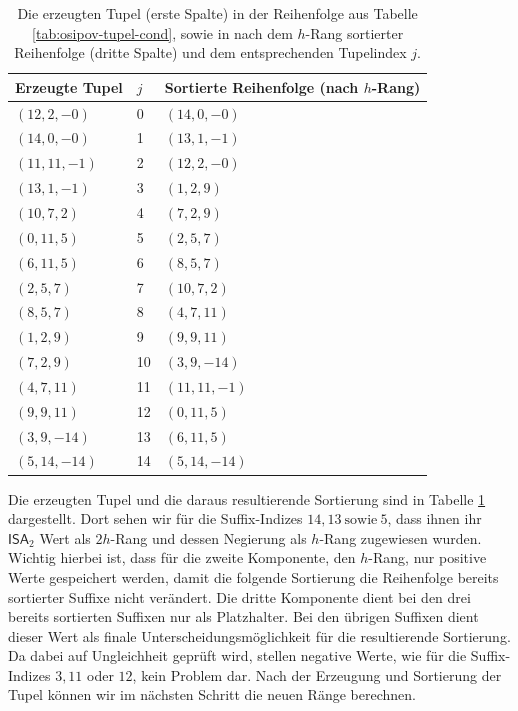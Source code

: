 \begin{table}[]
\small
\begin{tabular}{|l|l|l|}
\hline
Erzeugte Tupel & $j$  & Sortierte Reihenfolge (nach $h$-Rang) \\ \hline
$(12, 2, -0)$  & 0  & $(14,0,-0)$                           \\ \hline
$(14, 0, -0)$  & 1  & $(13,1,-1)$                           \\ \hline
$(11,11,-1)$   & 2  & $(12,2,-0)$                           \\ \hline
$(13,1,-1)$    & 3  & $(1,2,9)$                             \\ \hline
$(10,7,2)$     & 4  & $(7,2,9)$                             \\ \hline
$(0,11,5)$     & 5  & $(2,5,7)$                             \\ \hline
$(6,11,5)$     & 6  & $(8,5,7)$                             \\ \hline
$(2,5,7)$      & 7  & $(10,7,2)$                            \\ \hline
$(8,5,7)$      & 8  & $(4,7,11)$                            \\ \hline
$(1,2,9)$      & 9  & $(9,9,11)$                            \\ \hline
$(7,2,9)$      & 10 & $(3,9,-14)$                           \\ \hline
$(4,7,11)$     & 11 & $(11,11,-1)$                          \\ \hline
$(9,9,11)$     & 12 & $(0,11,5)$                            \\ \hline
$(3,9,-14)$    & 13 & $(6,11,5)$                            \\ \hline
$(5,14,-14)$   & 14 & $(5,14,-14)$                          \\ \hline
\end{tabular}
\caption{Die erzeugten Tupel (erste Spalte) in der Reihenfolge aus Tabelle \ref{tab:osipov-tupel-cond}, sowie in nach dem $h$-Rang sortierter Reihenfolge (dritte Spalte) und dem entsprechenden Tupelindex $j$.}
\label{tab:osipov-tupel-sort}
\end{table}

Die erzeugten Tupel und die daraus resultierende Sortierung sind in Tabelle \ref{tab:osipov-tupel-sort} dargestellt. Dort sehen wir für die Suffix-Indizes $14, 13 ~\text{sowie}~ 5$, dass ihnen ihr $\mathsf{ISA}_2$ Wert als $2h$-Rang und dessen Negierung als $h$-Rang zugewiesen wurden. Wichtig hierbei ist, dass für die zweite Komponente, den $h$-Rang, nur positive Werte gespeichert werden, damit die folgende Sortierung die Reihenfolge bereits sortierter Suffixe nicht verändert. Die dritte Komponente dient bei den drei bereits sortierten Suffixen nur als Platzhalter. Bei den übrigen Suffixen dient dieser Wert als finale Unterscheidungsmöglichkeit für die resultierende Sortierung. Da dabei auf Ungleichheit geprüft wird, stellen negative Werte, wie für die Suffix-Indizes $3, 11$ oder $12$, kein Problem dar. Nach der Erzeugung und Sortierung der Tupel können wir im nächsten Schritt die neuen Ränge berechnen.

